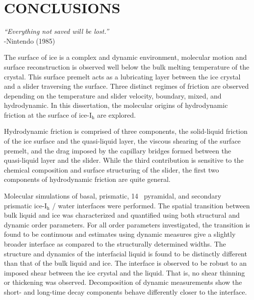 \chapter{CONCLUSIONS}\label{chap:Concl}

\begin{flushright}
\textit{``Everything not saved will be lost.''} \\
-Nintendo (1985) \\
\end{flushright}

The surface of ice is a complex and dynamic environment, molecular
motion and surface reconstruction is observed well below the bulk
melting temperature of the crystal. This surface premelt
acts as a lubricating layer between the ice crystal and a slider
traversing the surface.  Three distinct regimes of friction are
observed depending on the temperature and slider velocity, 
boundary, mixed, and hydrodynamic. In this dissertation, the molecular
origins of hydrodynamic friction at the surface of ice-I$_\mathrm{h}$
are explored.

Hydrodynamic friction is comprised of three components, the
solid-liquid friction of the ice surface and the quasi-liquid layer,
the viscous shearing of the surface premelt, and the drag imposed by
the capillary bridges formed between the quasi-liquid layer and the
slider. While the third contribution is sensitive to the chemical
composition and surface structuring of the slider, the first two
components of hydrodynamic friction are quite general. 

Molecular simulations of basal, prismatic, 14\degree~ pyramidal, and
secondary prismatic ice-I$_\mathrm{h}$ / water interfaces were
performed. The spatial transition between bulk liquid and ice was
characterized and quantified using both structural and dynamic order
parameters. For all order parameters investigated, the transition is
found to be continuous and estimates using dynamic measures give a
slightly broader interface as compared to the structurally determined
widths. The structure and dynamics of the interfacial liquid is found
to be distinctly different than that of the bulk liquid and ice. The
interface is observed to be robust to an imposed shear between the ice
crystal and the liquid. That is, no shear thinning or thickening was
observed. Decomposition of dynamic measurements show the short- and
long-time decay components behave differently closer to the interface.

